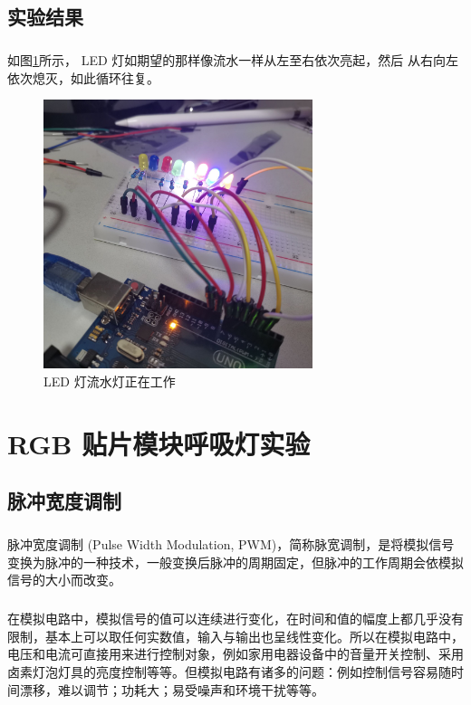 \documentclass[UTF8, oneside]{ctexbook}
\begin{document}
\section{实验结果}
\paragraph{}
如图\ref{b2_1}所示， LED 灯如期望的那样像流水一样从左至右依次亮起，然后
从右向左依次熄灭，如此循环往复。
\begin{figure}[h]
    \centering
    \includegraphics[width=0.7\textwidth]{./result/basic/2/result.jpg}
    \caption{LED 灯流水灯正在工作}
    \label{b2_1}
\end{figure}


\chapter{RGB 贴片模块呼吸灯实验}

\section{脉冲宽度调制}
\paragraph{}
脉冲宽度调制 (Pulse Width Modulation, PWM)，简称脉宽调制，是将模拟信号
变换为脉冲的一种技术，一般变换后脉冲的周期固定，但脉冲的工作周期会依模拟
信号的大小而改变。

\paragraph{}
在模拟电路中，模拟信号的值可以连续进行变化，在时间和值的幅度上都几乎没有
限制，基本上可以取任何实数值，输入与输出也呈线性变化。所以在模拟电路中，
电压和电流可直接用来进行控制对象，例如家用电器设备中的音量开关控制、采用
卤素灯泡灯具的亮度控制等等。但模拟电路有诸多的问题：例如控制信号容易随时
间漂移，难以调节；功耗大；易受噪声和环境干扰等等。
\end{document}

